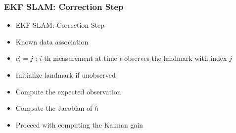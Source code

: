 \begin{frame}
    \frametitle{EKF SLAM: Correction Step}

    \begin{itemize}
        \item EKF SLAM: Correction Step
        \item Known data association
        \item $c_{t}^{i} = j$ : $i$-th measurement at time $t$ observes the landmark with index $j$
        \item Initialize landmark if unobserved
        \item Compute the expected observation
        \item Compute the Jacobian of $h$
        \item Proceed with computing the Kalman gain
    \end{itemize}

\end{frame}

